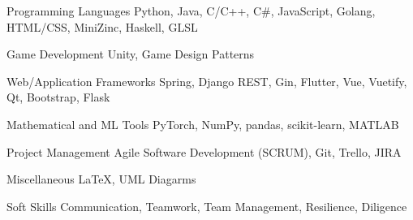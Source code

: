 

\begin{cvskills}

  \cvskill
    {Programming Languages} %
    {Python, Java, C/C++, C\#, JavaScript, Golang, HTML/CSS, MiniZinc, Haskell, GLSL} %

  \cvskill
    {Game Development} %
    {Unity, Game Design Patterns} %

  \ifbool{FullVersion}{
    \cvskill
        {GPU Programming Frameworks} %
        {CUDA and OpenACC} %
    
    \cvskill
        {Graphics Libraries} %
        {OpenGL, GLUT, GLFW, GLEW, SDL} %
  }{    
   \cvskill
    {Graphics and GPU Libraries} %
    {OpenGL, GLUT, GLFW, SDL, CUDA} %
  }


        

  \cvskill
    {Web/Application Frameworks} %
    {Spring, Django REST, Gin, Flutter, Vue, Vuetify, Qt, Bootstrap, Flask} %


  \cvskill
    {Mathematical and ML Tools} %
    {PyTorch, NumPy, pandas, scikit-learn, MATLAB} %

  \cvskill
    {Project Management} %
    {Agile Software Development (SCRUM), Git, Trello, JIRA} %

  \cvskill
    {Miscellaneous} %
    {\LaTeX \space, UML Diagarms} %

  \cvskill
    {Soft Skills} %
    {Communication, Teamwork, Team Management, Resilience, Diligence} %

\end{cvskills}
